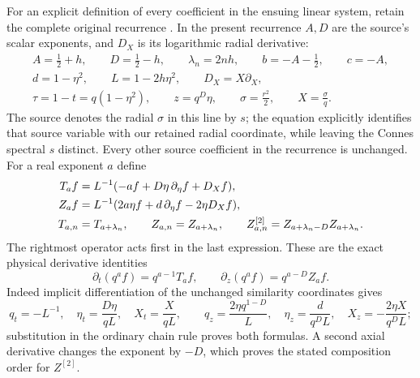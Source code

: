 For an explicit definition of every coefficient in the ensuing
linear system, retain the complete original recurrence
\cite[equations (4.1)--(4.2), (5.1)--(5.6)]{cqNS2026}.
In the present recurrence $A,D$ are the source's scalar
exponents, and $D_X$ is its logarithmic radial derivative:
\begin{equation}
\begin{gathered}
 A=\tfrac12+h,\qquad D=\tfrac12-h,\qquad
 \lambda_n=2nh,\qquad b=-A-\tfrac12,\qquad c=-A,\\
 d=1-\eta^2,\qquad L=1-2h\eta^2,\qquad D_X=X\partial_X,\\
 \tau=1-t=q(1-\eta^2),\qquad z=q^D\eta,\qquad
 \sigma=\frac{r^2}{2},\qquad X=\frac{\sigma}{q}.
\end{gathered}
 \label{eq:cq-source-recurrence-parameters}
\end{equation}
The source denotes the radial $\sigma$ in this line by $s$;
the equation explicitly identifies that source variable with
our retained radial coordinate, while leaving the Connes
spectral $s$ distinct. Every other source coefficient in the
recurrence is unchanged. For a real exponent $a$ define
\begin{align}
 T_a f&=L^{-1}(-af+D\eta\,\partial_\eta f+D_Xf),\notag\\
 Z_a f&=L^{-1}(2a\eta f+d\,\partial_\eta f-2\eta D_Xf),\notag\\
 T_{a,n}&=T_{a+\lambda_n},\qquad
 Z_{a,n}=Z_{a+\lambda_n},\qquad
 Z^{[2]}_{a,n}=Z_{a+\lambda_n-D}Z_{a+\lambda_n}.
 \label{eq:cq-source-profile-time-axial-operators}
\end{align}
The rightmost operator acts first in the last expression.
These are the exact physical derivative identities
\[
 \partial_t(q^af)=q^{a-1}T_af,\qquad
 \partial_z(q^af)=q^{a-D}Z_af.
\]
Indeed implicit differentiation of the unchanged similarity
coordinates gives
\[
 q_t=-L^{-1},\quad \eta_t=\frac{D\eta}{qL},\quad
 X_t=\frac{X}{qL},\qquad
 q_z=\frac{2\eta q^{1-D}}L,\quad
 \eta_z=\frac{d}{q^DL},\quad
 X_z=-\frac{2\eta X}{q^DL};
\]
substitution in the ordinary chain rule proves both formulas.
A second axial derivative changes the exponent by $-D$,
which proves the stated composition order for $Z^{[2]}$.

